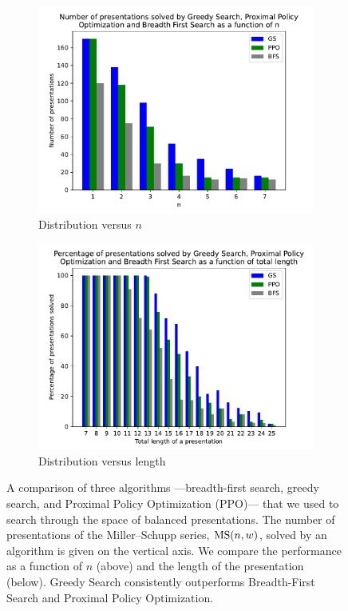 \begin{figure}
	\centering
	\begin{subfigure}[b]{0.5\textwidth}
		\includegraphics[width=1.1\textwidth]{fig/performance_vs_n.pdf}
		\caption{Distribution versus $n$}
		\label{fig:performance_vs_n}
	\end{subfigure}
	\begin{subfigure}[b]{0.5\textwidth}
		\centering
		\includegraphics[width=1.1\textwidth]{fig/performance_vs_length.pdf}
		\caption{Distribution versus length}
		\label{fig:performance_vs_length}
	\end{subfigure}
	\caption{A comparison of three algorithms ---breadth-first search, greedy search, and Proximal Policy Optimization (PPO)--- that we used to search through the space of balanced presentations. The number of presentations of the Miller--Schupp series, $\text{MS}(n, w)$, solved by an algorithm is given on the vertical axis. We compare the performance as a function of $n$ (above) and the length of the presentation (below). Greedy Search consistently outperforms Breadth-First Search and Proximal Policy Optimization.}
	\label{fig:performance}
\end{figure}